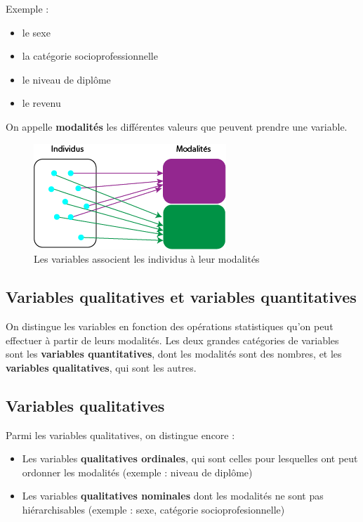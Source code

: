 \documentclass[
  french,
]{book}
\providecommand{\tightlist}{%
  \setlength{\itemsep}{0pt}\setlength{\parskip}{0pt}}
\begin{document}
Exemple :

\begin{itemize}
\tightlist
\item
  le sexe
\item
  la catégorie socioprofessionnelle
\item
  le niveau de diplôme
\item
  le revenu
\end{itemize}

On appelle \textbf{modalités} les différentes valeurs que peuvent prendre une variable.

\begin{figure}
\centering
\includegraphics{images/modalites.png}
\caption{Les variables associent les individus à leur modalités}
\end{figure}

\hypertarget{variables-qualitatives-et-variables-quantitatives}{%
\subsection{Variables qualitatives et variables quantitatives}\label{variables-qualitatives-et-variables-quantitatives}}

On distingue les variables en fonction des opérations statistiques qu'on peut effectuer à partir de leurs modalités. Les deux grandes catégories de variables sont les \textbf{variables quantitatives}, dont les modalités sont des nombres, et les \textbf{variables qualitatives}, qui sont les autres.

\hypertarget{variables-qualitatives}{%
\subsection{Variables qualitatives}\label{variables-qualitatives}}

Parmi les variables qualitatives, on distingue encore :

\begin{itemize}
\tightlist
\item
  Les variables \textbf{qualitatives ordinales}, qui sont celles pour lesquelles ont peut ordonner les modalités (exemple : niveau de diplôme)
\item
  Les variables \textbf{qualitatives nominales} dont les modalités ne sont pas hiérarchisables (exemple : sexe, catégorie socioprofesionnelle)
\end{itemize}
\end{document}
